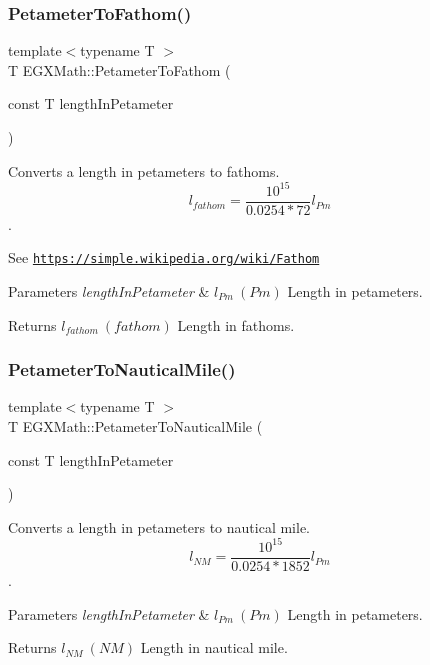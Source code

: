 \subsubsection{\texorpdfstring{Petameter\+To\+Fathom()}{PetameterToFathom()}}
{\footnotesize\ttfamily template$<$typename T $>$ \\
T E\+G\+X\+Math\+::\+Petameter\+To\+Fathom (\begin{DoxyParamCaption}\item[{const T}]{length\+In\+Petameter }\end{DoxyParamCaption})}



Converts a length in petameters to fathoms. \[ l_{fathom}= \frac{10^{15}}{0.0254 * 72} l_{Pm} \]. 

See \href{https://simple.wikipedia.org/wiki/Fathom}{\tt https\+://simple.\+wikipedia.\+org/wiki/\+Fathom} 
\begin{DoxyParams}{Parameters}
{\em length\+In\+Petameter} & $ l_{Pm}\ (Pm)$ Length in petameters. \\
\hline
\end{DoxyParams}
\begin{DoxyReturn}{Returns}
$ l_{fathom}\ (fathom)$ Length in fathoms. 
\end{DoxyReturn}
\mbox{\label{group___e_g_x_math-_conversions-_length_conversions-_petameter-_nautical_gad71d96fd4a94e830ae0e768a41d993af}} 
\subsubsection{\texorpdfstring{Petameter\+To\+Nautical\+Mile()}{PetameterToNauticalMile()}}
{\footnotesize\ttfamily template$<$typename T $>$ \\
T E\+G\+X\+Math\+::\+Petameter\+To\+Nautical\+Mile (\begin{DoxyParamCaption}\item[{const T}]{length\+In\+Petameter }\end{DoxyParamCaption})}



Converts a length in petameters to nautical mile. \[ l_{NM}= \frac{10^{15}}{0.0254 * 1852} l_{Pm} \]. 


\begin{DoxyParams}{Parameters}
{\em length\+In\+Petameter} & $ l_{Pm}\ (Pm)$ Length in petameters. \\
\hline
\end{DoxyParams}
\begin{DoxyReturn}{Returns}
$ l_{NM}\ (NM)$ Length in nautical mile. 
\end{DoxyReturn}
